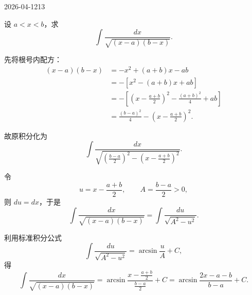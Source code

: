 \begin{mistake}{2026-04-12}{13}

\begin{problemcontent}
设 \(a<x<b\)，求
\[
\int \frac{dx}{\sqrt{(x-a)(b-x)}}.
\]

\end{problemcontent}

\begin{solutioncontent}
先将根号内配方：
\[
\begin{aligned}
(x-a)(b-x)
&=-x^2+(a+b)x-ab\\
&=-\left[x^2-(a+b)x+ab\right]\\
&=-\left[\left(x-\frac{a+b}{2}\right)^2-\frac{(a+b)^2}{4}+ab\right]\\
&=\frac{(b-a)^2}{4}-\left(x-\frac{a+b}{2}\right)^2.
\end{aligned}
\]

故原积分化为
\[
\int \frac{dx}{\sqrt{\left(\frac{b-a}{2}\right)^2-\left(x-\frac{a+b}{2}\right)^2}}.
\]

令
\[
u=x-\frac{a+b}{2},
\qquad
A=\frac{b-a}{2}>0,
\]
则 \(du=dx\)，于是
\[
\int \frac{dx}{\sqrt{(x-a)(b-x)}}
=\int \frac{du}{\sqrt{A^2-u^2}}.
\]

利用标准积分公式
\[
\int \frac{du}{\sqrt{A^2-u^2}}=\arcsin\frac{u}{A}+C,
\]
得
\[
\int \frac{dx}{\sqrt{(x-a)(b-x)}}
=\arcsin\frac{x-\frac{a+b}{2}}{\frac{b-a}{2}}+C
=\arcsin\frac{2x-a-b}{b-a}+C.
\]

\end{solutioncontent}


\end{mistake}
